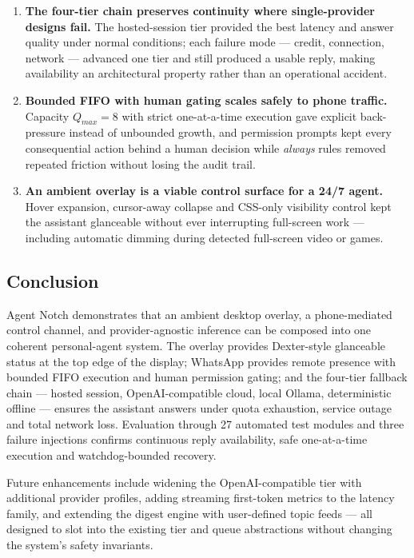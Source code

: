 \begin{enumerate}
  \item \textbf{The four-tier chain preserves continuity where
  single-provider designs fail.} The hosted-session tier
  provided the best latency and answer quality under normal
  conditions; each failure mode --- credit, connection, network
  --- advanced one tier and still produced a usable reply,
  making availability an architectural property rather than an
  operational accident.
  \item \textbf{Bounded FIFO with human gating scales safely to
  phone traffic.} Capacity $Q_{max}=8$ with strict one-at-a-time
  execution gave explicit back-pressure instead of unbounded
  growth, and permission prompts kept every consequential action
  behind a human decision while \emph{always} rules removed
  repeated friction without losing the audit trail.
  \item \textbf{An ambient overlay is a viable control surface
  for a 24/7 agent.} Hover expansion, cursor-away collapse and
  CSS-only visibility control kept the assistant glanceable
  without ever interrupting full-screen work --- including
  automatic dimming during detected full-screen video or games.
\end{enumerate}

\subsection{Conclusion}

Agent Notch demonstrates that an ambient desktop overlay, a
phone-mediated control channel, and provider-agnostic inference
can be composed into one coherent personal-agent system. The
overlay provides Dexter-style glanceable status at the top edge
of the display; WhatsApp provides remote presence with bounded
FIFO execution and human permission gating; and the four-tier
fallback chain --- hosted session, OpenAI-compatible cloud,
local Ollama, deterministic offline --- ensures the assistant
answers under quota exhaustion, service outage and total
network loss. Evaluation through 27 automated test modules and
three failure injections confirms continuous reply availability,
safe one-at-a-time execution and watchdog-bounded recovery.

Future enhancements include widening the OpenAI-compatible tier
with additional provider profiles, adding streaming first-token
metrics to the latency family, and extending the digest engine
with user-defined topic feeds --- all designed to slot into the
existing tier and queue abstractions without changing the
system's safety invariants.

